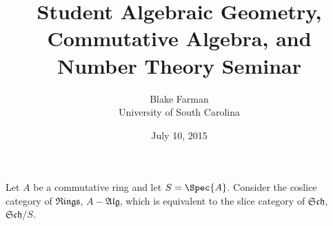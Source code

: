 \documentclass[10pt]{amsart}
\author{Blake Farman\\University of South Carolina}
\title{Student Algebraic Geometry, Commutative Algebra, and Number Theory Seminar}
\date{July 10, 2015}
\begin{document}
\maketitle

\providecommand{\p}{\mathfrak{p}}
\providecommand{\m}{\mathfrak{m}}
\newcommand{\legendre}[2]{\left(\frac{#1}{#2}\right)}
\theoremstyle{plain}
\newtheorem{thm}{}
\newtheorem{lem}{Lemma}
\theoremstyle{definition}
\newtheorem{defn}{Definition}
\newtheorem{prop}{Proposition}
\newtheorem{cor}{Corollary}
\newtheorem{rmk}{Remark}

Let $A$ be a commutative ring and let $S = \Spec{A}$.
Consider the coslice category of $\mathfrak{Rings}$, $A-\mathfrak{Alg}$, which is equivalent to the slice category of $\mathfrak{Sch}$, $\mathfrak{Sch}/S$.
\end{document}
